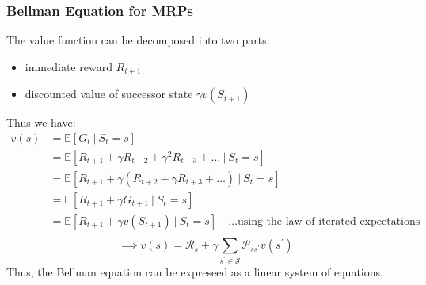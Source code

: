 \subsubsection{Bellman Equation for MRPs}
The value function can be decomposed into two parts:
\begin{itemize}
    \item immediate reward \(R_{t+1}\)
    \item discounted value of successor state \(\gamma v(S_{t+1})\)
\end{itemize}
Thus we have:
\[
    \begin{aligned}
        v(s) & = \mathbb{E}  [ G_{t} \ |\  S_{t} = s] \\
             & = \mathbb{E}  [ R_{t+1} + \gamma R_{t+2} + \gamma^{2} R_{t+3} + \dots \ |\  S_{t} = s] \\
             & = \mathbb{E}  [ R_{t+1} + \gamma (R_{t+2} + \gamma R_{t+3} + \dots) \ |\  S_{t} = s] \\
             & = \mathbb{E}  [ R_{t+1} + \gamma G_{t+1} \ |\  S_{t} = s] \\
             & = \mathbb{E}  [ R_{t+1} + \gamma v(S_{t+1}) \ |\  S_{t} = s] \quad \dots \text{using the law of iterated expectations} \\ 
    \end{aligned}
\]
\[
    \implies v(s) = \mathcal{R} _{s} + \gamma \sum_{s^{\prime} \in \mathcal{S} } \mathcal{P} _{ss^{\prime}} v(s^{\prime})
\]
Thus, the Bellman equation can be expreseed as a linear system of equations.

